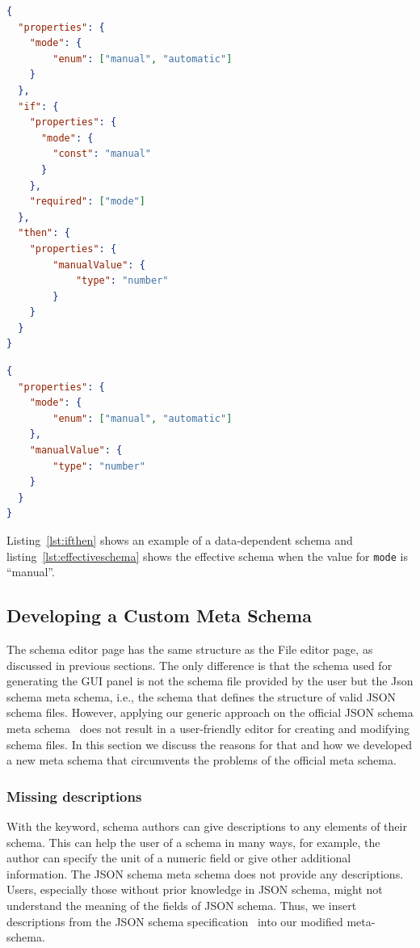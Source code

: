 \begin{lstlisting}[language=json, firstnumber=1, caption=
    {Data dependent schema. If the field \texttt{mode} is set to ``manual'' in the data, users will expect that the GUI shows the \texttt{manualValue} property}, captionpos=b, label={lst:ifthen}]
{
  "properties": {
    "mode": {
        "enum": ["manual", "automatic"]
    }
  },
  "if": {
    "properties": {
      "mode": {
        "const": "manual"
      }
    },
    "required": ["mode"]
  },
  "then": {
    "properties": {
        "manualValue": {
            "type": "number"
        }
    }
  }
}
\end{lstlisting}
\begin{lstlisting}[language=json, firstnumber=1, caption=
    {Effective schema when the value for \texttt{mode} is ``manual''}, captionpos=b, label={lst:effectiveschema}]
{
  "properties": {
    "mode": {
        "enum": ["manual", "automatic"]
    },
    "manualValue": {
        "type": "number"
    }
  }
}
\end{lstlisting}

Listing~\ref{lst:ifthen} shows an example of a data-dependent schema and listing~\ref{lst:effectiveschema} shows
the effective schema when the value for \texttt{mode} is ``manual''.

\subsection{Developing a Custom Meta Schema}\label{subsec:schema-editor}

The schema editor page has the same structure as the File editor page, as discussed in previous sections.
The only difference is that the schema used for generating the GUI panel is not the schema file provided by the user but the Json schema meta schema,
i.e., the schema that defines the structure of valid JSON schema files.
However, applying our generic approach on the official JSON schema meta schema~\cite{jsonschemaJSONSchema} does not result in a user-friendly editor for
creating and modifying schema files.
In this section we discuss the reasons for that and how we developed a new meta schema that circumvents the problems of the official meta schema.

\subsubsection{Missing descriptions}
With the  keyword, schema authors can give descriptions to any elements of their schema.
This can help the user of a schema in many ways, for example, the author can specify the unit of a numeric field or give other additional information.
The JSON schema meta schema does not provide any descriptions.
Users, especially those without prior knowledge in JSON schema, might not understand the meaning of the fields of JSON schema.
Thus, we insert descriptions from the JSON schema specification~\cite{jsonschemaJSONSchema} into our modified meta-schema.

